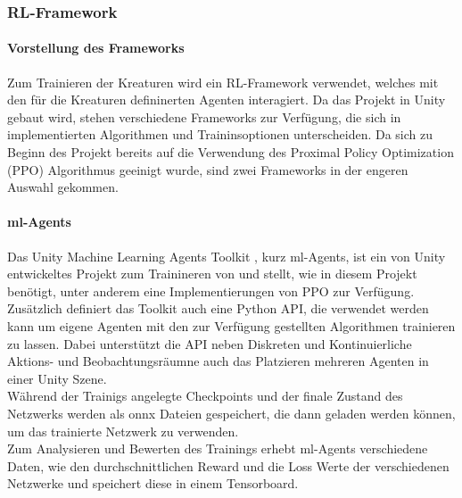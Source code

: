 \subsubsection{RL-Framework}

\paragraph{Vorstellung des Frameworks}
Zum Trainieren der Kreaturen wird ein RL-Framework verwendet, welches mit den für die Kreaturen defininerten Agenten interagiert. Da das Projekt in Unity gebaut wird, stehen verschiedene Frameworks zur Verfügung, die sich in implementierten Algorithmen und Traininsoptionen unterscheiden. Da sich zu Beginn des Projekt bereits auf die Verwendung des Proximal Policy Optimization (PPO) Algorithmus geeinigt wurde, sind zwei Frameworks in der engeren Auswahl gekommen.

\paragraph{ml-Agents}\fup \label{mlAgentsFramework}
Das Unity Machine Learning Agents Toolkit \cite{juliani2020}, kurz ml-Agents, ist ein von Unity entwickeltes Projekt zum Trainineren von  und stellt, wie in diesem Projekt benötigt, unter anderem eine Implementierungen von PPO zur Verfügung.
Zusätzlich definiert das Toolkit auch eine Python API, die verwendet werden kann um eigene Agenten mit den zur Verfügung gestellten Algorithmen trainieren zu lassen.
Dabei unterstützt die API neben Diskreten und Kontinuierliche Aktions- und Beobachtungsräumne auch das Platzieren mehreren Agenten in einer Unity Szene.\\

\noindent Während der Trainigs angelegte Checkpoints und der finale Zustand des Netzwerks werden als onnx Dateien gespeichert, die dann geladen werden können, um das trainierte Netzwerk zu verwenden.\\
Zum Analysieren und Bewerten des Trainings erhebt ml-Agents verschiedene Daten, wie den durchschnittlichen Reward und die Loss Werte der verschiedenen Netzwerke und speichert diese in einem Tensorboard. 

